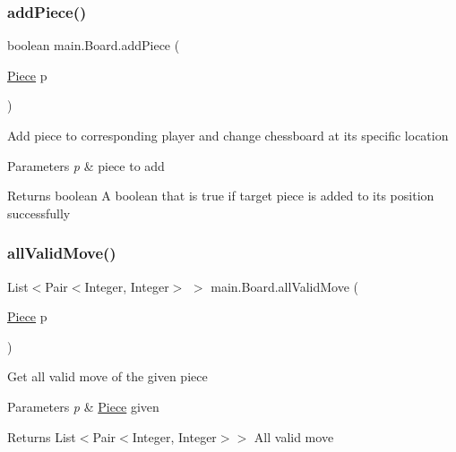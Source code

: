 \subsubsection{\texorpdfstring{addPiece()}{addPiece()}\hspace{0.1cm}{\footnotesize\ttfamily [2/2]}}
{\footnotesize\ttfamily boolean main.\+Board.\+add\+Piece (\begin{DoxyParamCaption}\item[{\mbox{\hyperlink{classmain_1_1_piece}{Piece}}}]{p }\end{DoxyParamCaption})\hspace{0.3cm}{\ttfamily [inline]}}

Add piece to corresponding player and change chessboard at its specific location


\begin{DoxyParams}{Parameters}
{\em p} & piece to add \\
\hline
\end{DoxyParams}
\begin{DoxyReturn}{Returns}
boolean A boolean that is true if target piece is added to its position successfully 
\end{DoxyReturn}
\mbox{\label{classmain_1_1_board_ab71b56cf4b3f302460d5be49116e3317}} 
\subsubsection{\texorpdfstring{allValidMove()}{allValidMove()}}
{\footnotesize\ttfamily List$<$Pair$<$Integer, Integer$>$ $>$ main.\+Board.\+all\+Valid\+Move (\begin{DoxyParamCaption}\item[{\mbox{\hyperlink{classmain_1_1_piece}{Piece}}}]{p }\end{DoxyParamCaption})\hspace{0.3cm}{\ttfamily [inline]}}

Get all valid move of the given piece 
\begin{DoxyParams}{Parameters}
{\em p} & \mbox{\hyperlink{classmain_1_1_piece}{Piece}} given \\
\hline
\end{DoxyParams}
\begin{DoxyReturn}{Returns}
List$<$Pair$<$\+Integer, Integer$>$$>$ All valid move 
\end{DoxyReturn}
\mbox{\label{classmain_1_1_board_a4b106e6cb7a063ccc588cd1b54541ca2}} 
